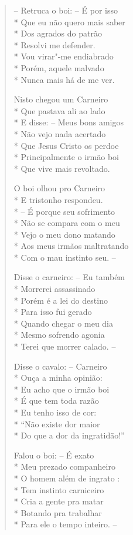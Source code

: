 \begin{verse}
--  Retruca o boi: --  É por isso\\*
Que eu não quero mais saber\\*
Dos agrados do patrão\\*
Resolvi me defender.\\*
Vou virar"-me endiabrado\\*
Porém, aquele malvado\\*
Nunca mais há de me ver.

Nisto chegou um Carneiro\\*
Que pastava ali ao lado\\*
E disse: --  Meus bons amigos\\*
Não vejo nada acertado\\*
Que Jesus Cristo os perdoe\\*
Principalmente o irmão boi\\*
Que vive mais revoltado.

O boi olhou pro Carneiro\\*
E tristonho respondeu.\\*
--  É porque seu sofrimento\\*
Não se compara com o meu\\*
Vejo o meu dono matando\\*
Aos meus irmãos maltratando\\*
Com o mau instinto seu. --

Disse o carneiro: --  Eu também\\*
Morrerei assassinado\\*
Porém é a lei do destino\\*
Para isso fui gerado\\*
Quando chegar o meu dia\\*
Mesmo sofrendo agonia\\*
Terei que morrer calado. --

Disse o cavalo: --  Carneiro\\*
Ouça a minha opinião:\\*
Eu acho que o irmão boi\\*
É que tem toda razão\\*
Eu tenho isso de cor:\\*
``Não existe dor maior\\*
Do que a dor da ingratidão!''

Falou o boi: --  É exato\\*
Meu prezado companheiro\\*
O homem além de ingrato :\\*
Tem instinto carniceiro\\*
Cria a gente pra matar\\*
Botando pra trabalhar\\*
Para ele o tempo inteiro. --


\end{verse}
